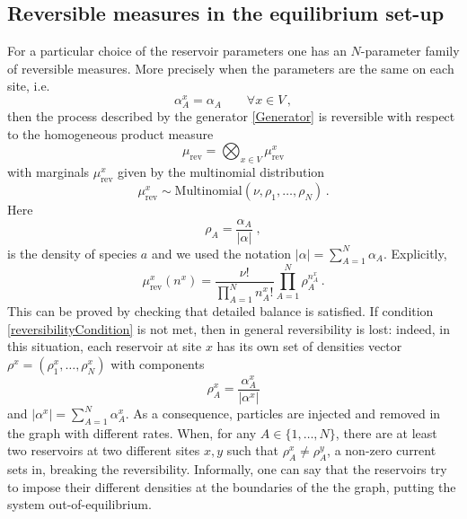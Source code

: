 \documentclass[10pt]{article}
\numberwithin{equation}{section}
\numberwithin{equation}{subsection}
\newcommand{\co}{\;,}
\newcommand{\twoj}{\nu}
\begin{document}
\subsection{Reversible measures in the equilibrium set-up}
For a particular choice of the reservoir parameters one has an $N$-parameter family of reversible measures. More precisely
when the parameters are the same on each site, i.e.
\begin{equation}\label{reversibilityCondition}
\alpha_{A}^{x}=\alpha_{A}\qquad \forall x\in V\,,
\end{equation}
then the process described by the generator \eqref{Generator} is reversible with respect to the 
homogeneous product measure 
\begin{equation}
\label{reversibleMeasure}
\mu_{\text{rev}}=\bigotimes_{x\in V}\mu_{\text{rev}}^{x}
\end{equation}
with marginals $\mu_{\text{rev}}^{x}$ given by  the multinomial distribution
\begin{equation}
 \mu^{x}_{\text{rev}}\sim \text{Multinomial}\left(\twoj,\rho_{1},\ldots,\rho_{N}\right)\,.
\end{equation}
Here
 $$
\rho_{A}=\frac{\alpha_{A}}{|\alpha|}\co
$$
is the density of species $a$ and we used the notation $|\alpha|=\sum_{A=1}^{N}\alpha_{A}$. Explicitly, 
\begin{equation}
\mu_{\text{rev}}^{x}(n^{x})=\frac{\nu!}{\prod_{A=1}^{N}n_{A}^{x}!}\prod_{A=1}^{N}\rho_{A}^{n_{A}^{x}}\,.
\end{equation}
This can be proved  by checking that detailed balance is satisfied. 
If condition \eqref{reversibilityCondition} is not met, then in general reversibility is lost: indeed, in this situation, each reservoir at site $x$ has  its own set of densities vector $\rho^{x}=(\rho_{1}^{x},\ldots,\rho_{N}^{x})$ with components
\begin{equation}
	\label{rhox}
	\rho_{A}^x=\frac{\alpha_{A}^x}{|\alpha^x|}
\end{equation}
and  $|\alpha^x|=\sum_{A=1}^{N}\alpha_{A}^x$. {As a consequence, particles are injected and removed in the graph with different rates. When, for any $A\in \{1,\ldots,N\}$, there are at least two reservoirs at two different sites $x,y$ such that $\rho_{A}^{x}\neq  \rho_{A}^{y}$, a  non-zero current sets in, breaking the reversibility. Informally, one can say that the reservoirs try to impose their different densities at the boundaries of the the graph, putting the system out-of-equilibrium.} 
\end{document}
